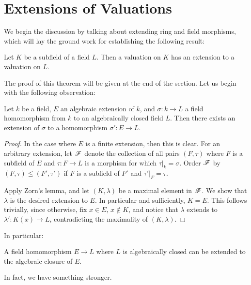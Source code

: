 \section{Extensions of Valuations}

We begin the discussion by talking about extending ring and field 
morphisms, which will lay the ground work for establishing the 
following result:

\begin{thm}\label{thm_ext_val}
Let $K$ be a subfield of a field $L$. Then a valuation on $K$ has 
an extension to a valuation on $L$.
\end{thm}

The proof of this theorem will be given at the end of the section.
Let us begin with the following observation:

\begin{prop}\label{prop_lang_2_8}
Let $k$ be a field, $E$ an algebraic extension of $k$, and 
$\sigma: k \to L$ a field homomorphism from $k$ to an 
algebraically closed field $L$. Then there exists an extension of 
$\sigma$ to a homomorphism $\sigma': E \to L$.
\end{prop}

\begin{proof}
In the case where $E$ is a finite extension, then this is clear.
For an arbitrary extension, let $\mathscr{F}$ denote the collection
of all pairs $(F, \tau)$ where $F$ is a subfield of $E$ and 
$\tau: F \to L$ is a morphism for which $\tau|_k = \sigma$. 
Order $\mathscr{F}$ by $(F, \tau) \leq (F', \tau')$ if $F$ is a 
subfield of $F'$ and $\tau'|_F = \tau$.

Apply Zorn's lemma, and let $(K, \lambda)$ be a maximal element
in $\mathscr{F}$. We show that $\lambda$ is the desired extension to 
$E$. In particular and sufficiently, $K = E$. This follows 
trivially, since otherwise, fix $x \in E$, $x \notin K$, and 
notice that $\lambda$ extends to $\lambda': K(x) \to L$, 
contradicting the maximality of $(K, \lambda)$.
\end{proof}

In particular:

\begin{cor}
A field homomorphism $E \to L$ where $L$ is algebraically closed
can be extended to the algebraic closure of $E$.
\end{cor}

In fact, we have something stronger.


